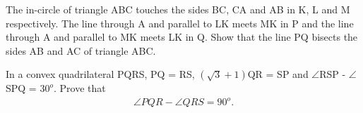 \item The in-circle of triangle ABC touches the sides BC, CA and AB in K, L and M respectively. The line through A and parallel to LK meets MK in P and the line through A and parallel to MK meets LK in Q. Show that the line PQ bisects the sides AB and AC of triangle ABC.

\item In a convex quadrilateral PQRS, PQ = RS,
 $(\sqrt{3} + 1)$QR = SP and $\angle$RSP - $\angle$SPQ = $30^{o}$. Prove that
\begin{align*} 
\angle PQR - \angle QRS = 90^{o}.
\end{align*}






















